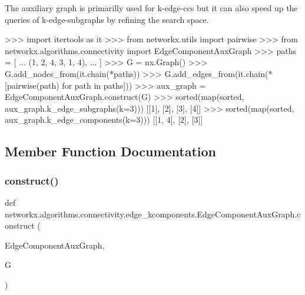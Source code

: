 \begin{DoxyVerb}
The auxiliary graph is primarilly used for k-edge-ccs but it
can also speed up the queries of k-edge-subgraphs by refining the
search space.

>>> import itertools as it
>>> from networkx.utils import pairwise
>>> from networkx.algorithms.connectivity import EdgeComponentAuxGraph
>>> paths = [
...     (1, 2, 4, 3, 1, 4),
... ]
>>> G = nx.Graph()
>>> G.add_nodes_from(it.chain(*paths))
>>> G.add_edges_from(it.chain(*[pairwise(path) for path in paths]))
>>> aux_graph = EdgeComponentAuxGraph.construct(G)
>>> sorted(map(sorted, aux_graph.k_edge_subgraphs(k=3)))
[[1], [2], [3], [4]]
>>> sorted(map(sorted, aux_graph.k_edge_components(k=3)))
[[1, 4], [2], [3]]
\end{DoxyVerb}
 

\subsection{Member Function Documentation}
\mbox{\label{classnetworkx_1_1algorithms_1_1connectivity_1_1edge__kcomponents_1_1EdgeComponentAuxGraph_a08fef06d73ac430968ec0a9af50d47f4}} 
\subsubsection{\texorpdfstring{construct()}{construct()}}
{\footnotesize\ttfamily def networkx.\+algorithms.\+connectivity.\+edge\+\_\+kcomponents.\+Edge\+Component\+Aux\+Graph.\+construct (\begin{DoxyParamCaption}\item[{}]{Edge\+Component\+Aux\+Graph,  }\item[{}]{G }\end{DoxyParamCaption})}

